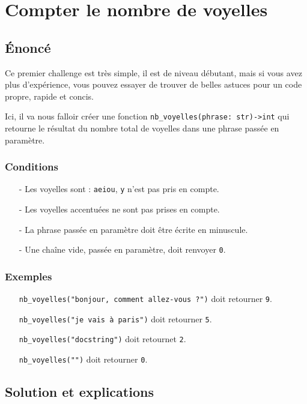 \chapter{Compter le nombre de voyelles}
\vspace{2cm}
\section{Énoncé}
\medskip

Ce premier challenge est très simple, il est de niveau \og débutant\fg{}, mais si vous avez plus d'expérience, vous pouvez essayer de trouver de belles astuces pour un code propre, rapide et concis.
\medskip

Ici, il va nous falloir créer une fonction \verb|nb_voyelles(phrase: str)->int| qui retourne le résultat du nombre total de voyelles dans une phrase passée en paramètre.
\medskip

\subsection*{Conditions}
\begin{itemize}
	\item[-] Les voyelles sont : \texttt{aeiou}, \texttt{y} n’est pas pris en compte.
	\item[-] Les voyelles accentuées ne sont pas prises en compte.
	\item[-] La phrase passée en paramètre doit être écrite en minuscule.
	\item[-] Une chaîne vide, passée en paramètre, doit renvoyer \texttt{0}.
\end{itemize}
\medskip

\subsection*{Exemples}
\begin{itemize}
	\item[\textbullet] \verb|nb_voyelles("bonjour, comment allez-vous ?")| doit retourner \texttt{9}.
	\item[\textbullet] \verb|nb_voyelles("je vais à paris")| doit retourner \texttt{5}.
	\item[\textbullet] \verb|nb_voyelles("docstring")| doit retournet \texttt{2}.
	\item[\textbullet] \verb|nb_voyelles("")| doit retourner \texttt{0}.
\end{itemize}
\medskip

\section{Solution et explications}
\medskip

